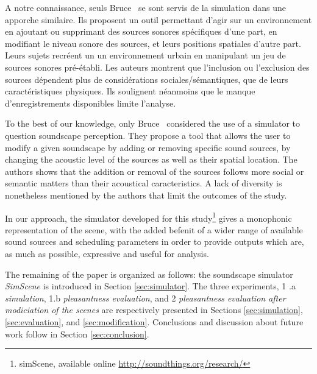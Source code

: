 \documentclass[twoside,twocolumn]{article}
\begin{document}
A notre connaissance, seuls Bruce~\al \cite{bruce2009development,bruce2014effects} se sont servis de la simulation dans une apporche similaire. Ils proposent un outil permettant d'agir sur un environnement en ajoutant ou supprimant des sources sonores spécifiques d'une part, en modifiant le niveau sonore des sources, et leurs positions spatiales d'autre part. Leurs sujets recréent un un environnement urbain en manipulant un jeu de sources sonores pré-établi. Les auteurs montrent que l'inclusion ou l'exclusion des sources dépendent plus de considérations sociales/sémantiques, que de leurs caractéristiques physiques. Ils soulignent néanmoins que le manque d'enregistrements disponibles limite l'analyse.

To the best of our knowledge, only Bruce~\al \cite{bruce2009development,bruce2014effects} considered the use of a simulator to question soundscape perception. They propose a tool that allows the user to modify a given soundscape by adding or removing specific sound sources, by changing the acoustic level of the sources as well as their spatial location. The authors shows that the addition or removal of the sources follows more social or semantic matters than their acoustical caracteristics. A lack of diversity is nonetheless mentioned by the authors that limit the outcomes of the study.


In our approach, the simulator developed for this study\footnote{simScene, available online \url{http://soundthings.org/research/}} gives a monophonic representation of the scene, with the added befenit of a wider range of available sound sources and scheduling parameters in order to provide outputs which are, as much as possible, expressive and useful for analysis.


The remaining of the paper is organized as follows: the soundscape simulator \emph{SimScene} is introduced in Section \ref{sec:simulator}. The three experiments,  1 .a \emph{simulation}, 1.b \emph{pleasantness evaluation}, and 2 \emph{pleasantness evaluation after modiciation of the scenes} are respectively presented in Sections \ref{sec:simulation}, \ref{sec:evaluation}, and \ref{sec:modification}. Conclusions and discussion about future work follow in Section \ref{sec:conclusion}.
\end{document}
